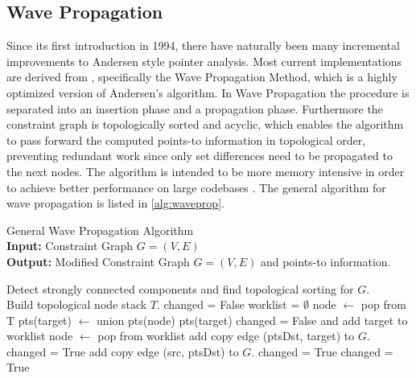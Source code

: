 \subsection{Wave Propagation}
Since its first introduction in 1994, there have naturally been many incremental improvements to Andersen style pointer analysis.
Most current implementations are derived from \cite{waveprop}, specifically the Wave Propagation Method, which is a highly optimized version of Andersen's algorithm.
In Wave Propagation the procedure is separated into an insertion phase and a propagation phase. Furthermore the constraint graph is topologically sorted and acyclic, which enables the algorithm to pass forward the computed points-to information in topological order, preventing redundant work since only set differences need to be propagated to the next nodes. The algorithm is intended to be more memory intensive in order to achieve better performance on large codebases \cite{waveprop}.
The general algorithm for wave propagation is listed in \autoref{alg:waveprop}.

\begin{algorithm}
    \caption{General Wave Propagation Algorithm \\ \textbf{Input:} Constraint Graph $G=(V,E)$ \\ \textbf{Output:} Modified Constraint Graph $G=(V,E)$ and points-to information.}\label{alg:waveprop}
    \begin{algorithmic}
        \State Detect strongly connected components and find topological sorting for $G$. \\ Build topological node stack $T$.
        \Repeat
        \State changed = False
        \State worklist = $\emptyset$
        \State node $\leftarrow$ pop from T
        \State pts(target) $\leftarrow$ union pts(node) pts(target)
        \State changed = False and add target to worklist
        \EndIf
        \EndFor
        \EndWhile
        \State node $\leftarrow$ pop from worklist
        \State add copy edge (ptsDst, target) to $G$.
        \State changed = True
        \EndIf
        \EndFor
        \EndFor
        \State add copy edge (src, ptsDst) to $G$.
        \State changed = True
        \EndIf
        \EndFor
        \EndFor
        \EndWhile
        \State changed = True
        \EndIf
    \end{algorithmic}
\end{algorithm}

